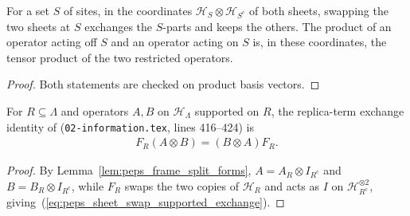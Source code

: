\begin{lemma}
    \label{lem:lattice_sheet_split_swap}
    \leanok
    For a set $S$ of sites, in the coordinates $\mathcal H_S\otimes\mathcal
        H_{S^c}$ of both sheets, swapping the two sheets at $S$ exchanges the
    $S$-parts and keeps the others. The product of an operator acting off $S$ and
    an operator acting on $S$ is, in these coordinates, the tensor product of the
    two restricted operators.
\end{lemma}

\begin{proof}\leanok
    Both statements are checked on product basis vectors.
\end{proof}

\begin{lemma}
    \label{thm:peps_sheet_swap_supported_exchange}
    \leanok
    For $R\subseteq\Lambda$ and operators $A,B$ on $\mathcal H_\Lambda$
    supported on $R$, the replica-term exchange identity of
    \cite{OpenAI2026PolynomialPEPS} (\texttt{02-information.tex}, lines 416--424)
    is
    \begin{align}
        F_R(A\otimes B)=(B\otimes A)F_R.
        \label{eq:peps_sheet_swap_supported_exchange}
    \end{align}
\end{lemma}

\begin{proof}\leanok
    By Lemma~\ref{lem:peps_frame_split_forms}, $A=A_R\otimes I_{R^c}$ and
    $B=B_R\otimes I_{R^c}$, while $F_R$ swaps the two copies of $\mathcal H_R$
    and acts as $I$ on $\mathcal H_{R^c}^{\otimes 2}$, giving~(\ref{eq:peps_sheet_swap_supported_exchange}).
\end{proof}

